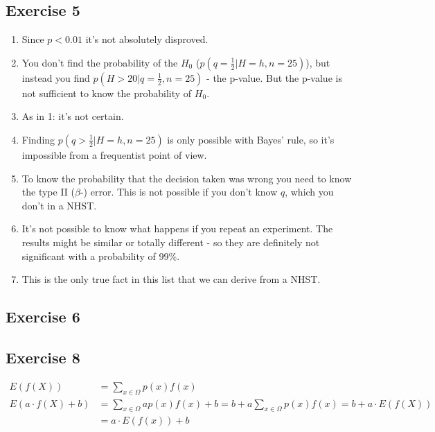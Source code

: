\subsection*{Exercise 5}
\begin{enumerate}
	\item Since $p < 0.01$ it's not absolutely disproved.
  \item You don't find the probability of the $H_0$ ($p(q=\frac{1}{2}|H=h,n=25)$), but instead you find $p(H>20|q=\frac{1}{2},n=25)$ - the p-value. But the p-value is not sufficient to know the probability of $H_0$.
  \item As in 1: it's not certain.
  \item Finding $p(q>\frac{1}{2}|H=h,n=25)$ is only possible with Bayes' rule, so it's impossible from a frequentist point of view.
  \item To know the probability that the decision taken was wrong you need to know the type II ($\beta$-) error. This is not possible if you don't know $q$, which you don't in a NHST.
  \item It's not possible to know what happens if you repeat an experiment. The results might be similar or totally different - so they are definitely not significant with a probability of 99\%.
  \item This is the only true fact in this list that we can derive from a NHST.
\end{enumerate}

\subsection*{Exercise 6}


\subsection*{Exercise 8}
\begin{align*}
E(f(X)) &= \sum_{x\in\Omega}p(x)f(x) \\
E(a\cdot f(X) + b) &= \sum_{x\in\Omega}ap(x)f(x)+b = b+a\sum_{x\in\Omega}p(x)f(x) = b+a\cdot E(f(X))\\
                   &= a\cdot E(f(x)) + b
\end{align*}


